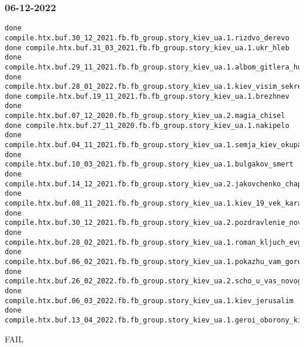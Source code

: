  
 
 
 
 

\subsubsection{06-12-2022}
\label{sec:build.log.06_12_2022}

\begin{Verbatim}
done compile.htx.buf.30_12_2021.fb.fb_group.story_kiev_ua.1.rizdvo_derevo
done compile.htx.buf.31_03_2021.fb.fb_group.story_kiev_ua.1.ukr_hleb
done compile.htx.buf.29_11_2021.fb.fb_group.story_kiev_ua.1.albom_gitlera_hudozhnik_gluschenko
done compile.htx.buf.28_01_2022.fb.fb_group.story_kiev_ua.1.kiev_visim_sekretiv
done compile.htx.buf.19_11_2021.fb.fb_group.story_kiev_ua.1.brezhnev
done compile.htx.buf.07_12_2020.fb.fb_group.story_kiev_ua.2.magia_chisel
done compile.htx.buf.27_11_2020.fb.fb_group.story_kiev_ua.1.nakipelo
done compile.htx.buf.04_11_2021.fb.fb_group.story_kiev_ua.1.semja_kiev_okupacia
done compile.htx.buf.10_03_2021.fb.fb_group.story_kiev_ua.1.bulgakov_smert
done compile.htx.buf.14_12_2021.fb.fb_group.story_kiev_ua.2.jakovchenko_chaplin
done compile.htx.buf.08_11_2021.fb.fb_group.story_kiev_ua.1.kiev_19_vek_karaim_kupec_kogen
done compile.htx.buf.30_12_2021.fb.fb_group.story_kiev_ua.2.pozdravlenie_novyj_god_rizdvo
done compile.htx.buf.28_02_2021.fb.fb_group.story_kiev_ua.1.roman_kljuch_evgenij_iljin
done compile.htx.buf.06_02_2021.fb.fb_group.story_kiev_ua.1.pokazhu_vam_gorod
done compile.htx.buf.26_02_2022.fb.fb_group.story_kiev_ua.2.scho_u_vas_novogo
done compile.htx.buf.06_03_2022.fb.fb_group.story_kiev_ua.1.kiev_jerusalim
done compile.htx.buf.13_04_2022.fb.fb_group.story_kiev_ua.1.geroi_oborony_kieva
\end{Verbatim}

FAIL


